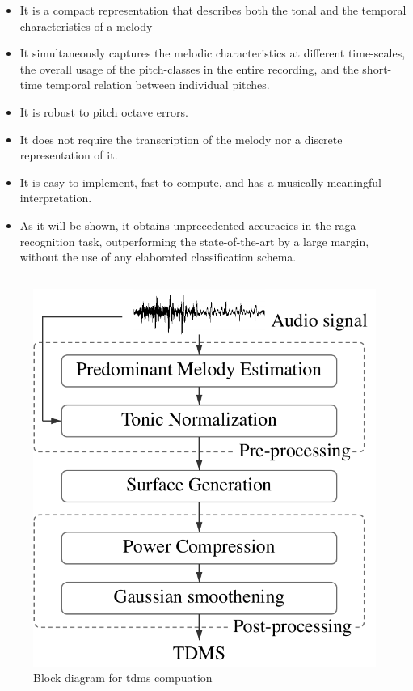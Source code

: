 \begin{itemize}
	\item It is a compact representation that describes both the tonal and the temporal characteristics of a melody
	\item It simultaneously captures the melodic characteristics at different time-scales, the overall usage of the pitch-classes in the entire recording, and the short-time temporal relation between individual pitches.
	\item It is robust to pitch octave errors.
	\item It does not require the transcription of the melody nor a discrete representation of it.
	\item It is easy to implement, fast to compute, and has a musically-meaningful interpretation.
	\item As it will be shown, it obtains unprecedented accuracies in the raga recognition task, outperforming the state-of-the-art by a large margin, without the use of any elaborated classification schema.
\end{itemize}




\subsection{}
\label{sec:tdms_feature_extraction}

\begin{figure}
	\begin{center}
		\includegraphics[width=\figSizeSixty]{ch07_ragaRecognition/figures/tdms_computation.pdf}
	\end{center}
	\caption{Block diagram for \gls{tdms} compuation}
	\label{fig:bd_tdms_computation}
\end{figure}

